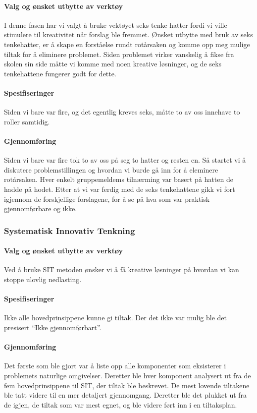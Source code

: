 \paragraph{Valg og ønsket utbytte av verktøy}
I denne fasen har vi valgt å bruke vektøyet seks tenke hatter fordi vi ville stimulere til kreativitet når forslag ble fremmet. Ønsket utbytte med bruk av seks tenkehatter, er å skape en forståelse rundt rotårsaken og komme opp meg mulige tiltak for å eliminere problemet. Siden problemet virker vanskelig å fikse fra skolen sin side måtte vi komme med noen kreative løsninger, og de seks tenkehattene fungerer godt for dette. 

\paragraph{Spesifiseringer}
Siden vi bare var fire, og det egentlig kreves seks, måtte to av oss innehave to roller samtidig. 

\paragraph{Gjennomføring}
Siden vi bare var fire tok to av oss på seg to hatter og resten en. Så startet vi å diskutere problemstillingen og hvordan vi burde gå inn for å eleminere rotårsaken. Hver enkelt gruppemeldems tilnærming var basert på hatten de hadde på hodet. Etter at vi var ferdig med de seks tenkehattene gikk vi fort igjennom de forskjellige forslagene, for å se på hva som var praktisk gjennomførbare og ikke. 


\subsubsection{Systematisk Innovativ Tenkning}

\paragraph{Valg og ønsket utbytte av verktøy}
Ved å bruke SIT metoden ønsker vi å få kreative løsninger på hvordan vi kan stoppe ulovlig nedlasting.

\paragraph{Spesifiseringer}
Ikke alle hovedprinsippene kunne gi tiltak. Der det ikke var mulig ble det presisert ``Ikke gjennomførbart''. 

\paragraph{Gjennomføring}
Det første som ble gjort var å liste opp alle komponenter som eksisterer i problemets naturlige omgivelser. Deretter ble hver komponent analysert ut fra de fem hovedprinsippene til SIT, der tiltak ble beskrevet. De mest lovende tiltakene ble tatt videre til en mer detaljert gjennomgang. Deretter ble det plukket ut fra de igjen, de tiltak som var mest egnet, og ble videre ført inn i en tiltaksplan. 


